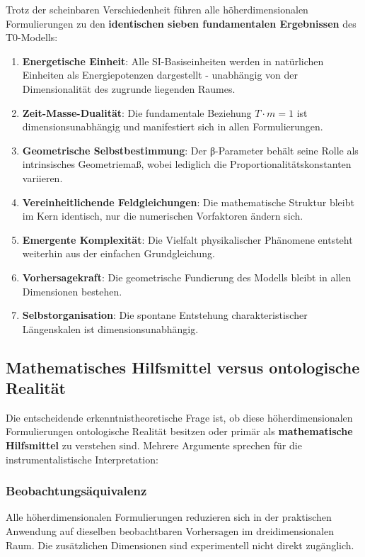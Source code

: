 \documentclass[12pt,a4paper]{report}
\begin{document}
	Trotz der scheinbaren Verschiedenheit führen alle höherdimensionalen Formulierungen zu den \textbf{identischen sieben fundamentalen Ergebnissen} des T0-Modells:
	
	\begin{enumerate}
		\item \textbf{Energetische Einheit}: Alle SI-Basiseinheiten werden in natürlichen Einheiten als Energiepotenzen dargestellt - unabhängig von der Dimensionalität des zugrunde liegenden Raumes.
		
		\item \textbf{Zeit-Masse-Dualität}: Die fundamentale Beziehung $T \cdot m = 1$ ist dimensionsunabhängig und manifestiert sich in allen Formulierungen.
		
		\item \textbf{Geometrische Selbstbestimmung}: Der β-Parameter behält seine Rolle als intrinsisches Geometriemaß, wobei lediglich die Proportionalitätskonstanten variieren.
		
		\item \textbf{Vereinheitlichende Feldgleichungen}: Die mathematische Struktur bleibt im Kern identisch, nur die numerischen Vorfaktoren ändern sich.
		
		\item \textbf{Emergente Komplexität}: Die Vielfalt physikalischer Phänomene entsteht weiterhin aus der einfachen Grundgleichung.
		
		\item \textbf{Vorhersagekraft}: Die geometrische Fundierung des Modells bleibt in allen Dimensionen bestehen.
		
		\item \textbf{Selbstorganisation}: Die spontane Entstehung charakteristischer Längenskalen ist dimensionsunabhängig.
	\end{enumerate}
	
	\subsection{Mathematisches Hilfsmittel versus ontologische Realität}
	
	Die entscheidende erkenntnistheoretische Frage ist, ob diese höherdimensionalen Formulierungen ontologische Realität besitzen oder primär als \textbf{mathematische Hilfsmittel} zu verstehen sind. Mehrere Argumente sprechen für die instrumentalistische Interpretation:
	
	\subsubsection{Beobachtungsäquivalenz}
	Alle höherdimensionalen Formulierungen reduzieren sich in der praktischen Anwendung auf dieselben beobachtbaren Vorhersagen im dreidimensionalen Raum. Die zusätzlichen Dimensionen sind experimentell nicht direkt zugänglich.
	
\end{document}
